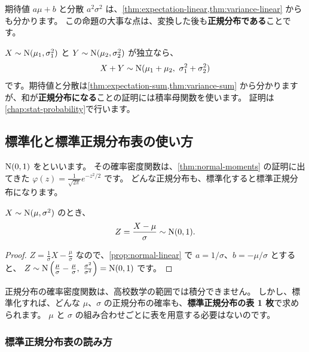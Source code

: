 期待値 $a\mu + b$ と分散 $a^2\sigma^2$ は、\cref{thm:expectation-linear,thm:variance-linear} からも分かります。
この命題の大事な点は、変換した後も\textbf{正規分布である}ことです。

\begin{supplement}[独立な正規分布の和]
  $X \sim \mathrm{N}(\mu_1, \sigma_1^2)$ と $Y \sim \mathrm{N}(\mu_2, \sigma_2^2)$ が独立なら、
  \[
    X + Y \sim \mathrm{N}(\mu_1 + \mu_2,\ \sigma_1^2 + \sigma_2^2)
  \]
  です。期待値と分散は\cref{thm:expectation-sum,thm:variance-sum} から分かりますが、和が\textbf{正規分布になる}ことの証明には積率母関数を使います。
  証明は\cref{chap:stat-probability}で行います。
\end{supplement}

\subsection{標準化と標準正規分布表の使い方}

$\mathrm{N}(0, 1)$ をといいます。
その確率密度関数は、\cref{thm:normal-moments} の証明に出てきた $\varphi(z) = \frac{1}{\sqrt{2\pi}} e^{-z^2/2}$ です。
どんな正規分布も、標準化すると標準正規分布になります。

\begin{corollary}
  $X \sim \mathrm{N}(\mu, \sigma^2)$ のとき、
  \[
    Z = \frac{X - \mu}{\sigma} \sim \mathrm{N}(0, 1).
  \]
\end{corollary}

\begin{proof}
  $Z = \frac{1}{\sigma} X - \frac{\mu}{\sigma}$ なので、\cref{prop:normal-linear} で $a = 1/\sigma$、$b = -\mu/\sigma$ とすると、
  $Z \sim \Normal\left(\frac{\mu}{\sigma} - \frac{\mu}{\sigma},\ \frac{\sigma^2}{\sigma^2}\right) = \Normal(0, 1)$ です。
\end{proof}

\begin{merit}
  正規分布の確率密度関数は、高校数学の範囲では積分できません。
  しかし、標準化すれば、どんな $\mu$、$\sigma$ の正規分布の確率も、\textbf{標準正規分布の表 1 枚}で求められます。
  $\mu$ と $\sigma$ の組み合わせごとに表を用意する必要はないのです。
\end{merit}

\subsubsection*{標準正規分布表の読み方}

